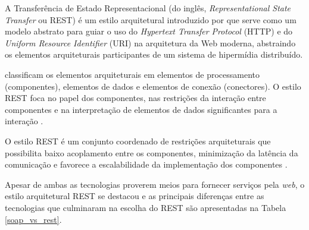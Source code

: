 
A Transferência de Estado Representacional (do inglês, \textit{Representational State Transfer} ou REST)
  é um estilo arquitetural introduzido por  que serve como um modelo abstrato
  para guiar o uso do \textit{Hypertext Transfer Protocol} (HTTP) e do \textit{Uniform Resource Identifier} (URI)
  na arquitetura da Web moderna, abstraindo os elementos arquiteturais participantes de um sistema de
  hipermídia distribuído.
  
   classificam os elementos arquiteturais em elementos de processamento (componentes),
  elementos de dados e elementos de conexão (conectores). O estilo REST foca no papel dos componentes, nas restrições
  da interação entre componentes e na interpretação de elementos de dados significantes para a interação \cite{fielding2002}.
  
  O estilo REST é um conjunto coordenado de restrições arquiteturais que possibilita baixo acoplamento entre os componentes,
  minimização da latência da comunicação e favorece a escalabilidade da implementação dos componentes \cite{fielding2002}.
  
   Apesar de ambas as tecnologias proverem meios para fornecer serviços pela \textit{web}, o estilo arquitetural REST se destacou
  e as principais diferenças entre as tecnologias que culminaram na escolha do REST são apresentadas na Tabela \ref{soap_vs_rest}.
  
